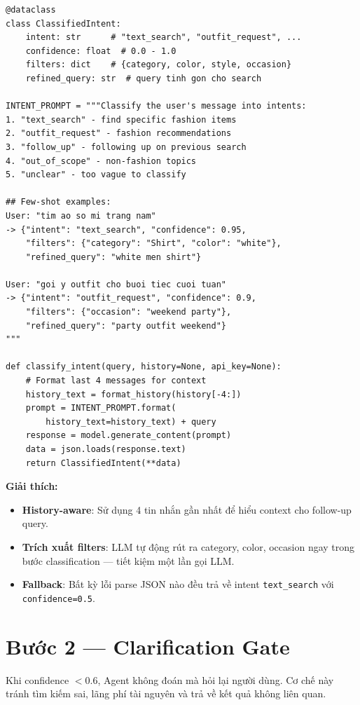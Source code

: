 \documentclass[12pt,a4paper]{report}
\begin{document}
\begin{lstlisting}[caption={Intent Classification --- agent/intent\_classifier.py}]
@dataclass
class ClassifiedIntent:
    intent: str      # "text_search", "outfit_request", ...
    confidence: float  # 0.0 - 1.0
    filters: dict    # {category, color, style, occasion}
    refined_query: str  # query tinh gon cho search

INTENT_PROMPT = """Classify the user's message into intents:
1. "text_search" - find specific fashion items
2. "outfit_request" - fashion recommendations
3. "follow_up" - following up on previous search
4. "out_of_scope" - non-fashion topics
5. "unclear" - too vague to classify

## Few-shot examples:
User: "tim ao so mi trang nam"
-> {"intent": "text_search", "confidence": 0.95,
    "filters": {"category": "Shirt", "color": "white"},
    "refined_query": "white men shirt"}

User: "goi y outfit cho buoi tiec cuoi tuan"
-> {"intent": "outfit_request", "confidence": 0.9,
    "filters": {"occasion": "weekend party"},
    "refined_query": "party outfit weekend"}
"""

def classify_intent(query, history=None, api_key=None):
    # Format last 4 messages for context
    history_text = format_history(history[-4:])
    prompt = INTENT_PROMPT.format(
        history_text=history_text) + query
    response = model.generate_content(prompt)
    data = json.loads(response.text)
    return ClassifiedIntent(**data)
\end{lstlisting}

\textbf{Giải thích:}
\begin{itemize}
    \item \textbf{History-aware}: Sử dụng 4 tin nhắn gần nhất để hiểu context cho follow-up query.
    \item \textbf{Trích xuất filters}: LLM tự động rút ra category, color, occasion ngay trong bước classification --- tiết kiệm một lần gọi LLM.
    \item \textbf{Fallback}: Bất kỳ lỗi parse JSON nào đều trả về intent \texttt{text\_search} với \texttt{confidence=0.5}.
\end{itemize}

\section{Bước 2 --- Clarification Gate}

\begin{tcolorbox}[title=Phương pháp: Proactive Clarification]
Khi confidence $< 0.6$, Agent không đoán mà hỏi lại người dùng. Cơ chế này tránh tìm kiếm sai, lãng phí tài nguyên và trả về kết quả không liên quan.
\end{tcolorbox}
\end{document}

